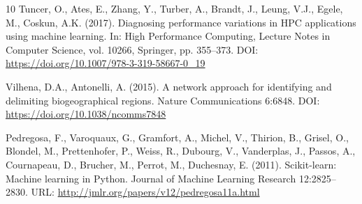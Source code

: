 \documentclass[11pt,a4paper]{article}
\begin{document}
\begin{thebibliography}{10}
Tuncer, O., Ates, E., Zhang, Y., Turber, A., Brandt, J., Leung, V.J.,
Egele, M., Coskun, A.K. (2017). Diagnosing performance variations in HPC
applications using machine learning. In: High Performance Computing,
Lecture Notes in Computer Science, vol. 10266, Springer, pp. 355--373.
DOI: \url{https://doi.org/10.1007/978-3-319-58667-0_19}

Vilhena, D.A., Antonelli, A. (2015). A network approach for identifying
and delimiting biogeographical regions. Nature Communications 6:6848.
DOI: \url{https://doi.org/10.1038/ncomms7848}

Pedregosa, F., Varoquaux, G., Gramfort, A., Michel, V., Thirion, B., Grisel, O., Blondel, M., Prettenhofer, P., Weiss, R., Dubourg, V., Vanderplas, J., Passos, A., Cournapeau, D., Brucher, M., Perrot, M., Duchesnay, E. (2011). Scikit-learn: Machine learning in Python. Journal of Machine Learning Research 12:2825--2830. URL: \url{http://jmlr.org/papers/v12/pedregosa11a.html}

\end{thebibliography}
\end{document}
